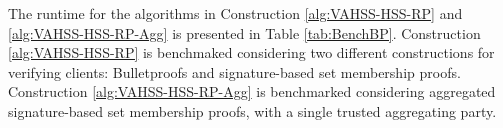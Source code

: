 

The runtime for the algorithms in Construction \ref{alg:VAHSS-HSS-RP} and \ref{alg:VAHSS-HSS-RP-Agg} is presented in Table \ref{tab:BenchBP}. Construction \ref{alg:VAHSS-HSS-RP} is benchmaked considering two different constructions for verifying clients:  Bulletproofs and signature-based set membership proofs. Construction \ref{alg:VAHSS-HSS-RP-Agg} is benchmarked considering aggregated signature-based set membership proofs, with a single trusted aggregating party.
 





